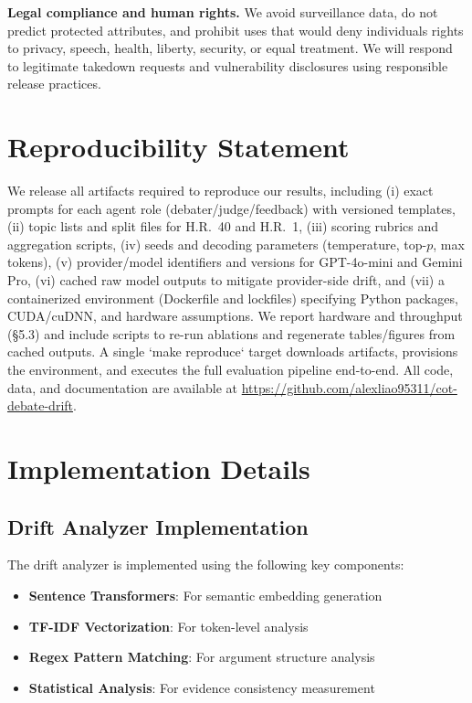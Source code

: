 \documentclass[11pt]{article}
\begin{document}
\textbf{Legal compliance and human rights.} We avoid surveillance data, do not predict protected attributes, and prohibit uses that would deny individuals rights to privacy, speech, health, liberty, security, or equal treatment. We will respond to legitimate takedown requests and vulnerability disclosures using responsible release practices.


\section*{Reproducibility Statement}
We release all artifacts required to reproduce our results, including (i) exact prompts for each agent role (debater/judge/feedback) with versioned templates, (ii) topic lists and split files for H.R.~40 and H.R.~1, (iii) scoring rubrics and aggregation scripts, (iv) seeds and decoding parameters (temperature, top-$p$, max tokens), (v) provider/model identifiers and versions for GPT-4o-mini and Gemini Pro, (vi) cached raw model outputs to mitigate provider-side drift, and (vii) a containerized environment (Dockerfile and lockfiles) specifying Python packages, CUDA/cuDNN, and hardware assumptions. We report hardware and throughput (\S5.3) and include scripts to re-run ablations and regenerate tables/figures from cached outputs. A single `make reproduce` target downloads artifacts, provisions the environment, and executes the full evaluation pipeline end-to-end. All code, data, and documentation are available at \url{https://github.com/alexliao95311/cot-debate-drift}.




\appendix

\section{Implementation Details}

\subsection{Drift Analyzer Implementation}

The drift analyzer is implemented using the following key components:

\begin{itemize}
    \item \textbf{Sentence Transformers}: For semantic embedding generation
    \item \textbf{TF-IDF Vectorization}: For token-level analysis
    \item \textbf{Regex Pattern Matching}: For argument structure analysis
    \item \textbf{Statistical Analysis}: For evidence consistency measurement
\end{itemize}
\end{document}
